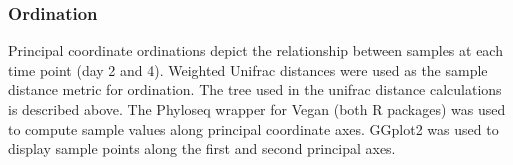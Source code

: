 \subsubsection{Ordination}
Principal coordinate ordinations depict the relationship between samples at each time point (day 2 and 4). Weighted Unifrac distances \cite{16332807} were used as the sample distance metric for ordination. The tree used in the unifrac distance calculations is described above. The Phyloseq \cite{24699258} wrapper for Vegan \cite{vegan} (both R packages) was used to compute sample values along principal coordinate axes. GGplot2 \cite{ggplot2} was used to display sample points along the first and second principal axes.    
